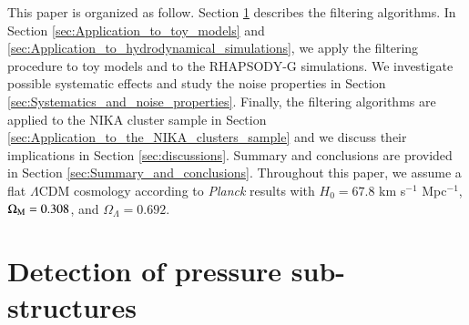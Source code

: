 \documentclass[twocolumn,traditabstract]{aa}
\begin{document}
This paper is organized as follow. Section \ref{sec:Pressure_substructures_detection} describes the filtering algorithms. In Section \ref{sec:Application_to_toy_models} and \ref{sec:Application_to_hydrodynamical_simulations}, we apply the filtering procedure to toy models and to the RHAPSODY-G simulations. We investigate possible systematic effects and study the noise properties in Section \ref{sec:Systematics_and_noise_properties}. Finally, the filtering algorithms are applied to the NIKA cluster sample in Section \ref{sec:Application_to_the_NIKA_clusters_sample} and we discuss their implications in Section \ref{sec:discussions}. Summary and conclusions are provided in Section \ref{sec:Summary_and_conclusions}. Throughout this paper, we assume a flat $\Lambda$CDM cosmology according to \textit{Planck} results \citep{Planck2016XIII} with $H_0 = 67.8$ km s$^{-1}$ Mpc$^{-1}$, $\Omega_{\rm M} = 0.308$, and $\Omega_{\Lambda} = 0.692$.

\section{Detection of pressure sub-structures}\label{sec:Pressure_substructures_detection}
\end{document}
